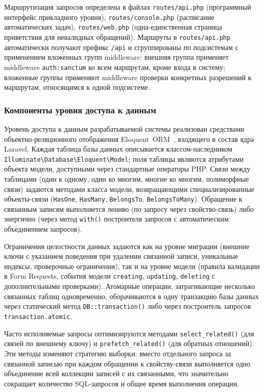 Маршрутизация запросов определена в файлах \texttt{routes/api.php} (программный интерфейс прикладного уровня), \texttt{routes/console.php} (расписание автоматических задач), \texttt{routes/web.php} (одна-единственная страница приветствия для невалидных обращений). Маршруты в \texttt{routes/api.php} автоматически получают префикс \texttt{/api} и сгруппированы по подсистемам с применением вложенных групп middleware: внешняя группа применяет middleware \texttt{auth:sanctum} ко всем маршрутам, кроме входа в систему; вложенные группы применяют middleware проверки конкретных разрешений к маршрутам, относящимся к одной подсистеме.

\subsubsection{Компоненты уровня доступа к данным}

Уровень доступа к данным разрабатываемой системы реализован средствами объектно-реляционного отображения Eloquent~ORM~\cite{romanov}, входящего в состав ядра Laravel. Каждая таблица базы данных описывается классом-наследником \texttt{Illuminate\textbackslash Database\textbackslash Eloquent\textbackslash Model}; поля таблицы являются атрибутами объекта модели, доступными через стандартные операторы PHP. Связи между таблицами (один к одному, один ко многим, многие ко многим, полиморфные связи) задаются методами класса модели, возвращающими специализированные объекты-связи (\texttt{HasOne}, \texttt{HasMany}, \texttt{BelongsTo}, \texttt{BelongsToMany}). Обращение к связанным записям выполняется лениво (по запросу через свойство-связь) либо энергично (через метод \texttt{with()} построителя запросов с автоматическим объединением запросов).

Ограничения целостности данных задаются как на уровне миграции (внешние ключи с указанием поведения при удалении связанной записи, уникальные индексы, проверочные ограничения), так и на уровне модели (правила валидации в Form Requests, события модели \texttt{creating}, \texttt{updating}, \texttt{deleting} с дополнительными проверками). Атомарные операции, затрагивающие несколько связанных таблиц одновременно, оборачиваются в одну транзакцию базы данных через статический метод \texttt{DB::transaction()} либо через построитель запросов \texttt{transaction.atomic}.

Часто исполняемые запросы оптимизируются методами \texttt{select\_related()} (для связей по внешнему ключу) и \texttt{prefetch\_related()} (для обратных отношений). Эти методы изменяют стратегию выборки: вместо отдельного запроса за связанной записью при каждом обращении к свойству-связи выполняется одно объединение всей коллекции записей с их связанными, что значительно сокращает количество SQL-запросов и общее время выполнения операции.

